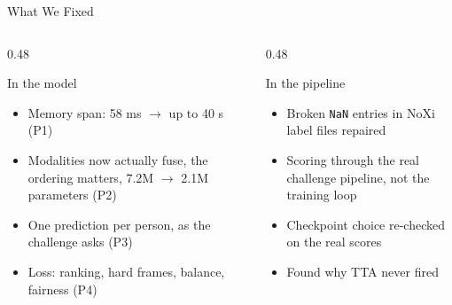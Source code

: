 \documentclass[aspectratio=169]{beamer}
\begin{document}
	\begin{frame}{What We Fixed}
		\begin{columns}[onlytextwidth]
			\begin{column}{0.48\textwidth}
				\begin{block}{In the model}
					\small
					\begin{itemize}
						\item Memory span: 58 ms $\to$ up to 40 s \hfill (P1)
						\item Modalities now actually fuse, the ordering matters,
						7.2M $\to$ 2.1M parameters \hfill (P2)
						\item One prediction per person, as the challenge asks \hfill (P3)
						\item Loss: ranking, hard frames, balance, fairness \hfill (P4)
					\end{itemize}
				\end{block}
			\end{column}
			\begin{column}{0.48\textwidth}
				\begin{block}{In the pipeline}
					\small
					\begin{itemize}
						\item Broken \texttt{NaN} entries in NoXi label files repaired
						\item Scoring through the real challenge pipeline, not the training loop
						\item Checkpoint choice re-checked on the real scores
						\item Found why TTA never fired
					\end{itemize}
				\end{block}
			\end{column}
		\end{columns}
		\vspace{0.6em}
		\begin{center}
		\end{center}
	\end{frame}
\end{document}
